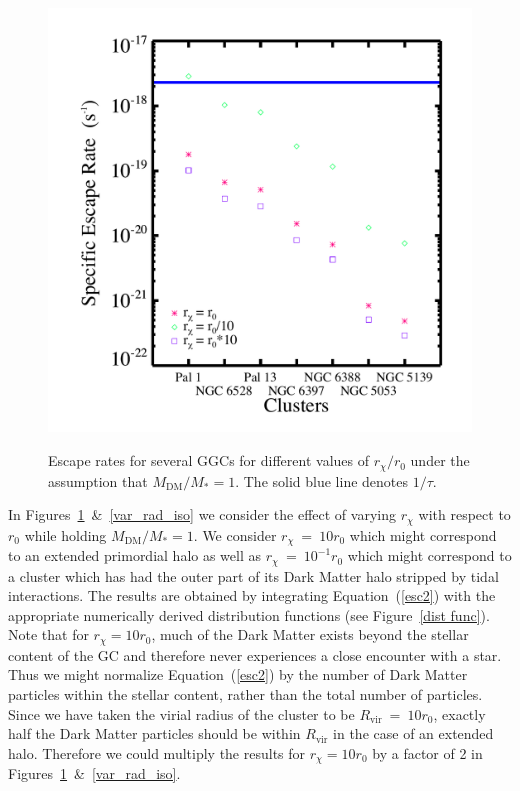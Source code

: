 \documentclass[aps,floatfix,prd,showpacs]{revtex4}
\newcommand{\rx}{r_\chi}
\newcommand{\MDM}{M_{\mathrm{DM}}}
\newcommand{\Rvir}{R_{\mathrm{vir}}}
\begin{document}
%
\begin{figure}[htp]
\centering
\includegraphics[width=12cm, height=12cm]{var_rad_not_iso}
\caption{Escape rates for several GGCs for different values of $\rx/r_0$ under the assumption that $\MDM/M_* = 1$. The solid blue line denotes $1/\tau$.}
\label{var_rad_not_iso}
\end{figure}
%
%

In Figures~\ref{var_rad_not_iso}~\&~\ref{var_rad_iso} we consider the effect of varying $\rx$ with respect to $r_0$ while holding $\MDM/M_* = 1$. We consider $\rx~=~10r_0$ which might correspond to an extended primordial halo as well as $\rx~=~10^{-1}r_0$ which might correspond to a cluster which has had the outer part of its Dark Matter halo stripped by tidal interactions. The results are obtained by integrating Equation~(\ref{esc2}) with the appropriate numerically derived distribution functions (see Figure~\ref{dist func}). Note that for $\rx = 10r_0$, much of the Dark Matter exists beyond the stellar content of the GC and therefore never experiences a close encounter with a star.  Thus we might normalize Equation~(\ref{esc2}) by the number of Dark Matter particles within the stellar content, rather than the total number of particles.  Since we have taken the virial radius of the cluster to be $\Rvir~=~10r_0$, exactly half the Dark Matter particles should be within $\Rvir$ in the case of an extended halo.  Therefore we could multiply the results for $\rx=10r_0$ by a factor of 2 in Figures~\ref{var_rad_not_iso}~\&~\ref{var_rad_iso}. 
\end{document}
